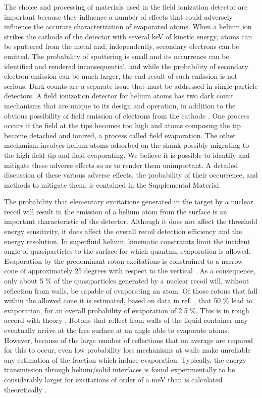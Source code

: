 \documentclass[10pt, letterpaper, reprint, superscriptaddress, aps, prl]
{revtex4-1} \usepackage[latin1]{inputenc}
\begin{document}
The choice and processing of materials used in the field ionization detector are important because they influence a number of effects that could adversely influence the accurate characterization of evaporated atoms. 
When a helium ion strikes the cathode of the detector with several keV of kinetic energy, atoms can be sputtered from the metal and, independently, secondary electrons can be emitted. 
The probability of sputtering is small and its occurrence can be identified and rendered inconsequential, and while the probability of secondary electron emission can be much larger, the end result of such emission is not serious.
Dark counts are a separate issue that must be addressed in single particle detectors. 
A field ionization detector for helium atoms has two dark count mechanisms that are unique to its design and operation, in addition to the obvious possibility of field emission of electrons from the cathode \cite{Suzuki2001,Lepetit2016}. 
One process occurs if the field at the tips becomes too high and atoms composing the tip become detached and ionized, a process called field evaporation. 
The other mechanism involves helium atoms adsorbed on the shank possibly migrating to the high field tip and field evaporating.
We believe it is possible to identify and mitigate these adverse effects so as to render them unimportant. 
A detailed discussion of these various adverse effects, the probability of their occurrence, and methods to mitigate them, is contained in the Supplemental Material.

The probability that elementary excitations generated in the target by a nuclear recoil will result in the emission of a helium atom from the surface is an important characteristic of the detector.
Although it does not affect the threshold energy sensitivity, it does affect the overall recoil detection efficiency and the energy resolution.
In superfluid helium, kinematic constraints limit the incident angle of quasiparticles to the surface for which quantum evaporation is allowed. Evaporation by the predominant roton excitations is constrained to a narrow cone of approximately 25 degrees with respect to the vertical \cite{Enss1994}. As a consequence, only about 5 \% of the quasiparticles generated by a nuclear recoil will, without reflection from walls, be capable of evaporating an atom.
Of those rotons that fall within the allowed cone it is estimated, based on data in ref. \cite{BandlerPhD1995}, that 50 \% lead to evaporation, for an overall probability of evaporation of 2.5 \%. 
This is in rough accord with theory \cite{Guilleumas1998}.
Rotons that reflect from walls of the liquid container may eventually arrive at the free surface at an angle able to evaporate atoms. 
However, because of the large number of reflections that on average are required for this to occur, even low probability loss mechanisms at walls make unreliable any estimation of the fraction which induce evaporation. 
Typically, the energy transmission through helium/solid interfaces is found experimentally \cite{Wyatt1976} to be considerably larger for excitations of order of a meV than is calculated theoretically \cite{Khalatnikov1965}. 
\end{document}
